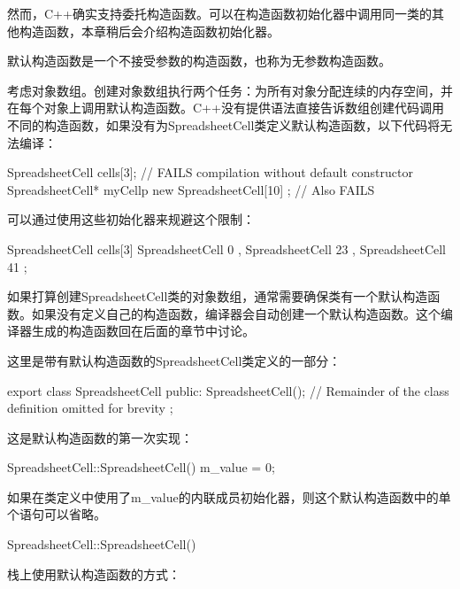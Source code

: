 然而，C++确实支持委托构造函数。可以在构造函数初始化器中调用同一类的其他构造函数，本章稍后会介绍构造函数初始化器。


默认构造函数是一个不接受参数的构造函数，也称为无参数构造函数。


考虑对象数组。创建对象数组执行两个任务：为所有对象分配连续的内存空间，并在每个对象上调用默认构造函数。C++没有提供语法直接告诉数组创建代码调用不同的构造函数，如果没有为SpreadsheetCell类定义默认构造函数，以下代码将无法编译：

\begin{cpp}
SpreadsheetCell cells[3]; // FAILS compilation without default constructor
SpreadsheetCell* myCellp { new SpreadsheetCell[10] }; // Also FAILS
\end{cpp}

可以通过使用这些初始化器来规避这个限制：

\begin{cpp}
SpreadsheetCell cells[3] { SpreadsheetCell { 0 }, SpreadsheetCell { 23 },
    SpreadsheetCell { 41 } };
\end{cpp}

如果打算创建SpreadsheetCell类的对象数组，通常需要确保类有一个默认构造函数。如果没有定义自己的构造函数，编译器会自动创建一个默认构造函数。这个编译器生成的构造函数回在后面的章节中讨论。


这里是带有默认构造函数的SpreadsheetCell类定义的一部分：

\begin{cpp}
export class SpreadsheetCell
{
    public:
        SpreadsheetCell();
        // Remainder of the class definition omitted for brevity
};
\end{cpp}

这是默认构造函数的第一次实现：

\begin{cpp}
SpreadsheetCell::SpreadsheetCell()
{
    m_value = 0;
}
\end{cpp}

如果在类定义中使用了m\_value的内联成员初始化器，则这个默认构造函数中的单个语句可以省略。

\begin{cpp}
SpreadsheetCell::SpreadsheetCell()
{}
\end{cpp}

栈上使用默认构造函数的方式：

